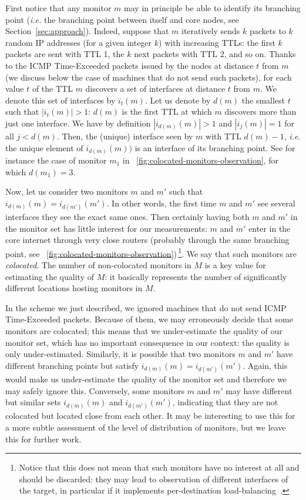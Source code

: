 \documentclass[conference]{IEEEtran}
\begin{document}
First notice that any monitor $m$ may in principle be able to identify its branching point ({\em i.e.} the branching point between itself and core nodes, see Section~\ref{sec:approach}). Indeed, suppose that $m$ iteratively sends $k$ packets to $k$ random IP addresses (for a given integer $k$) with increasing TTLs: the first $k$ packets are sent with TTL 1, the $k$ next packets with TTL 2, and so on. Thanks to the ICMP Time-Exceeded packets issued by the nodes at distance $t$ from $m$ (we discuss below the case of machines that do not send such packets), for each value $t$ of the TTL $m$ discovers a set of interfaces at distance $t$ from $m$. We denote this set of interfaces by $i_t(m)$. Let us denote by $d(m)$ the smallest $t$ such that $|i_t(m)|>1$: $d(m)$ is the first TTL at which $m$ discovers more than just one interface. We have by definition $|i_{d(m)}(m)|>1$ and $|i_j(m)|=1$ for all $j<d(m)$. Then, the (unique) interface seen by $m$ with TTL $d(m)-1$, {\em i.e.} the unique element of $i_{d(m)}(m))$ is an interface of its branching point. See for instance the case of monitor $m_1$ in \figurename~\ref{fig:colocated-monitors-observation}, for which $d(m_1)=3$.

Now, let us consider two monitors $m$ and $m'$ such that $i_{d(m)}(m) = i_{d(m')}(m')$. In other words, the first time $m$ and $m'$ see several interfaces they see the exact same ones. Then certainly having both $m$ and $m'$ in the monitor set has little interest for our measurements: $m$ and $m'$ enter in the core internet through very close routers (probably through the same branching point, see \figurename~\ref{fig:colocated-monitors-observation})\,\footnote{Notice that this does not mean that such monitors have no interest at all and should be discarded: they may lead to observation of different interfaces of the target, in particular if it implements per-destination load-balancing~\cite{paristraceroute}.}. We say that such monitors are {\em colocated}. The number of non-colocated monitors in $M$ is a key value for estimating the quality of $M$: it basically represents the number of significantly different locations hosting monitors in $M$.

In the scheme we just described, we ignored machines that do not send ICMP Time-Exceeded packets. Because of them, we may erroneously decide that some monitors are colocated; this means that we under-estimate the quality of our monitor set, which has no important consequence in our context: the quality is only under-estimated. Similarly, it is possible that two monitors $m$ and $m'$ have different branching points but satisfy $i_{d(m)}(m) = i_{d(m')}(m')$. Again, this would make us under-estimate the quality of the monitor set and therefore we may safely ignore this. Conversely, some monitors $m$ and $m'$ may have different but similar sets $i_{d(m)}(m)$ and $i_{d(m')}(m')$, indicating that they are not colocated but located close from each other. It may be interesting to use this for a more subtle assessment of the level of distribution of monitors, but we leave this for further work.
\end{document}
